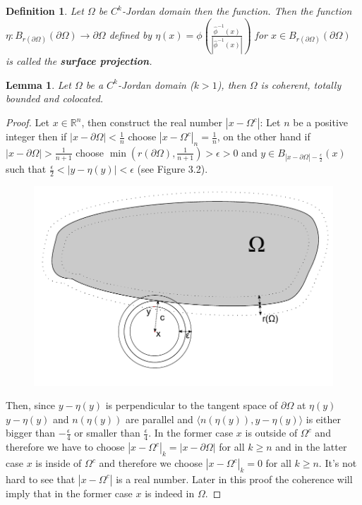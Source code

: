 \documentclass[11pt,a4paper,leqno]{report}
\newtheorem{lemma}[theorem]{Lemma}
\newtheorem{definition}[theorem]{Definition}
\numberwithin{equation}{chapter}
\begin{document}
\begin{definition} Let $\Omega$ be $C^k$-Jordan domain then the function. Then the function $\eta: B_{r(\partial\Omega)}(\partial\Omega)\rightarrow \partial\Omega$ defined by $\eta(x)=\phi(\frac{\hat{\phi}^{-1}(x)}{|\hat{\phi}^{-1}(x)|})$ for $x\in B_{r(\partial\Omega)}(\partial\Omega)$ is called the \textbf{surface projection}.\end{definition}
\begin{lemma} Let $\Omega$ be a $C^k$-Jordan domain ($k>1$), then $\Omega$ is coherent, totally bounded and colocated.
\end{lemma}
\begin{proof} Let $x\in\mathbb{R}^n$, then construct the real number $|x-\Omega^c|$:
Let $n$ be a positive integer then if $|x-\partial\Omega|<\frac{1}{n}$ choose $|x-\Omega^c|_n=\frac{1}{n}$, on the other hand if $|x-\partial\Omega|>\frac{1}{n+1}$ choose $\min(r(\partial\Omega),\frac{1}{n+1})>\epsilon>0$ and $y\in B_{|x-\partial\Omega|-\frac{\epsilon}{2}}(x)$ such that $\frac{\epsilon}{2}<|y-\eta(y)|<\epsilon$ (see Figure 3.2).
\begin{figure}[H]
\begin{center}
\caption{}
	 \includegraphics[height=0.55\textwidth, width=0.55\textheight]{Zeichnung.pdf}
\end{center}
\end{figure}
Then, since $y-\eta(y)$ is perpendicular to the tangent space of $\partial\Omega$ at $\eta(y)$ $y-\eta(y)$ and $n(\eta(y))$ are parallel and $\langle n(\eta(y)), y-\eta(y)\rangle$ is either bigger than $-\frac{\epsilon}{4}$ or smaller than $\frac{\epsilon}{4}$. In the former case $x$ is outside of $\Omega^c$ and therefore we have to choose $|x-\Omega^c|_k=|x-\partial\Omega|$ for all $k\geq n$ and in the latter case $x$ is inside of $\Omega^c$ and therefore we choose $|x-\Omega^c|_k=0$ for all $k\geq n$. It's not hard to see that $|x-\Omega^c|$ is a real number. Later in this proof the coherence will imply that in the former case $x$ is indeed in $\Omega$.


\end{proof}
\end{document}
